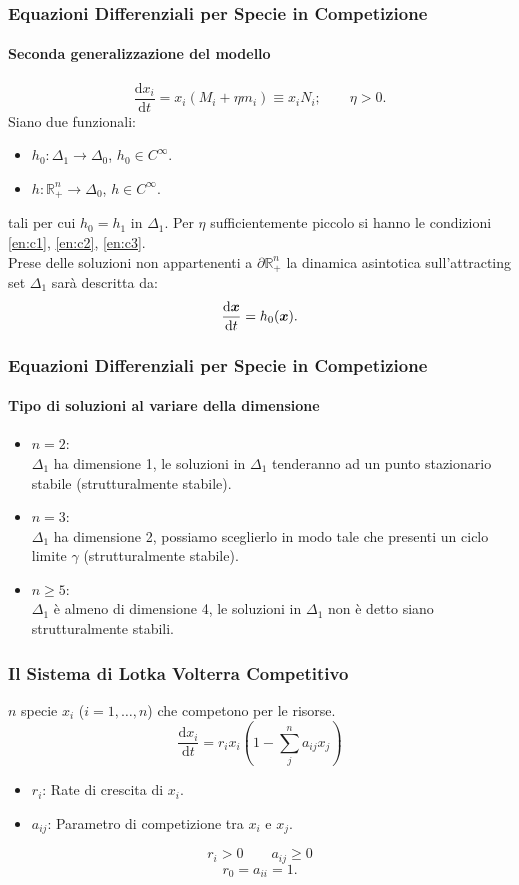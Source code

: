\begin{frame}
\frametitle{Equazioni Differenziali per Specie in Competizione}
\framesubtitle{Seconda generalizzazione del modello}
\[
    \frac{\text{d} x_i}{\text{d} t} = x_i\left(M_i + \eta m_i\right) \equiv x_i N_i; \qquad  \eta > 0
.\] 
Siano due funzionali:
\begin{itemize}
    \item $h_0: \Delta_1 \to \Delta_0$, $h_0 \in C^{\infty}$.
    \item $h:\mathbb{R}^n_+ \to \Delta_0$, $h\in C^{\infty}$.
\end{itemize}
tali per cui $h_0 = h_1$ in $\Delta_1$. Per $\eta$ sufficientemente piccolo si hanno le condizioni \ref{en:c1}, \ref{en:c2}, \ref{en:c3}.\\
Prese delle soluzioni non appartenenti a $\partial \mathbb{R}^n_+$ la dinamica asintotica sull'attracting set $\Delta_1$ sarà descritta da:
\[
    \frac{\text{d} \boldsymbol{x}}{\text{d} t} = h_0(\boldsymbol{x}) 
.\] 
\end{frame}

\begin{frame}
\frametitle{Equazioni Differenziali per Specie in Competizione}
\framesubtitle{Tipo di soluzioni al variare della dimensione}
\begin{itemize}
    \item $n=2$:\\
	$\Delta_1$ ha dimensione 1, le soluzioni in $\Delta_1$ tenderanno ad un punto stazionario stabile (strutturalmente stabile).
    \item $n = 3$:\\
	$\Delta_1$ ha dimensione 2, possiamo sceglierlo in modo tale che presenti un ciclo limite $\gamma$ (strutturalmente stabile).
    \item $n\ge 5$:\\
	$\Delta_1$ è almeno di dimensione 4, le soluzioni in $\Delta_1$ non è detto siano strutturalmente stabili.
\end{itemize}
\end{frame}

\begin{frame}
\frametitle{Il Sistema di Lotka Volterra Competitivo}
$n$ specie $x_i$ ($i = 1, \ldots, n$) che competono per le risorse.
\begin{equation}
    \frac{\text{d} x_i}{\text{d} t} = r_i x_i \left(1-\sum_{j}^{n} a_{ij}x_j\right)
    \label{eq:LVC}
\end{equation}
\begin{itemize}
    \item $r_i$: Rate di crescita di $x_i$.
    \item $a_{ij}$: Parametro di competizione tra $x_i$ e $x_j$.
\end{itemize}
\vspace{1.5em}
\begin{equation}
    r_i > 0 \qquad  a_{ij} \ge 0
    \label{eq:cond_ar}
\end{equation}
\[
    r_0 =  a_{ii} = 1
.\] 
\end{frame}

